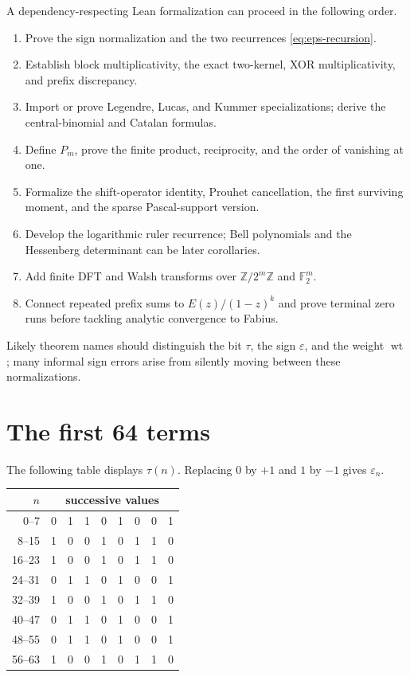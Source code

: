 \documentclass[11pt,oneside]{article}
\numberwithin{equation}{section}
\theoremstyle{definition}
\theoremstyle{remark}
\newcommand{\F}{\mathbb F}
\newcommand{\wt}{\operatorname{wt}}
\newcommand{\eps}{\varepsilon}
\newcommand{\TM}{\tau}
\begin{document}
A dependency-respecting Lean formalization can proceed in the following order.
\begin{enumerate}
 \item Prove the sign normalization and the two recurrences
       \eqref{eq:eps-recursion}.
 \item Establish block multiplicativity, the exact two-kernel, XOR
       multiplicativity, and prefix discrepancy.
 \item Import or prove Legendre, Lucas, and Kummer specializations; derive the
       central-binomial and Catalan formulas.
 \item Define \(P_m\), prove the finite product, reciprocity, and the order of
       vanishing at one.
 \item Formalize the shift-operator identity, Prouhet cancellation, the first
       surviving moment, and the sparse Pascal-support version.
 \item Develop the logarithmic ruler recurrence; Bell polynomials and the
       Hessenberg determinant can be later corollaries.
 \item Add finite DFT and Walsh transforms over \(\mathbb Z/2^m\mathbb Z\) and
       \(\F_2^m\).
 \item Connect repeated prefix sums to \(E(z)/(1-z)^k\) and prove terminal
       zero runs before tackling analytic convergence to Fabius.
\end{enumerate}
Likely theorem names should distinguish the bit \(\TM\), the sign \(\eps\),
and the weight \(\wt\); many informal sign errors arise from silently moving
between these normalizations.

\appendix

\section{The first 64 terms}
\label{app:first64}

The following table displays \(\TM(n)\).  Replacing \(0\) by \(+1\) and
\(1\) by \(-1\) gives \(\eps_n\).

\begin{center}
\small
\begin{longtable}{@{}r|*{8}{c}@{}}
\toprule
\(n\) & \multicolumn{8}{c}{successive values}\\
\midrule
\endhead
0--7   &0&1&1&0&1&0&0&1\\
8--15  &1&0&0&1&0&1&1&0\\
16--23 &1&0&0&1&0&1&1&0\\
24--31 &0&1&1&0&1&0&0&1\\
32--39 &1&0&0&1&0&1&1&0\\
40--47 &0&1&1&0&1&0&0&1\\
48--55 &0&1&1&0&1&0&0&1\\
56--63 &1&0&0&1&0&1&1&0\\
\bottomrule
\end{longtable}
\end{center}
\end{document}
